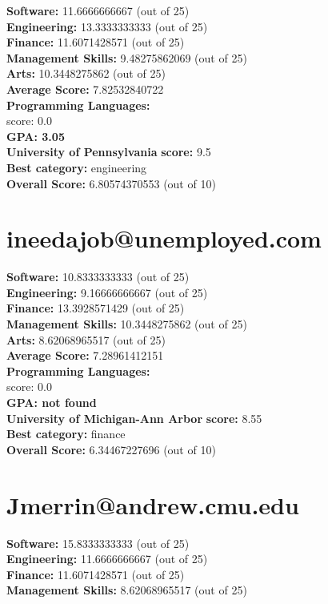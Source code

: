 \documentclass{article}
\begin{document}
\textbf{Software:} 11.6666666667 (out of 25)\\
\textbf{Engineering: } 13.3333333333 (out of 25)\\
\textbf{Finance:} 11.6071428571 (out of 25)\\
\textbf{Management Skills:} 9.48275862069 (out of 25)\\
\textbf{Arts:} 10.3448275862 (out of 25)\\
\textbf{Average Score: } 7.82532840722\\
\textbf{Programming Languages:} \\
score: 0.0\\
\textbf{GPA: 3.05}\\
\textbf{University of Pennsylvania} \textbf{score:} 9.5\\
\textbf{Best category: } engineering\\
\textbf{Overall Score: }6.80574370553 (out of 10)\section{ineedajob@unemployed.com}
\textbf{Software:} 10.8333333333 (out of 25)\\
\textbf{Engineering: } 9.16666666667 (out of 25)\\
\textbf{Finance:} 13.3928571429 (out of 25)\\
\textbf{Management Skills:} 10.3448275862 (out of 25)\\
\textbf{Arts:} 8.62068965517 (out of 25)\\
\textbf{Average Score: } 7.28961412151\\
\textbf{Programming Languages:} \\
score: 0.0\\
\textbf{GPA: not found}\\
\textbf{University of Michigan-Ann Arbor} \textbf{score:} 8.55\\
\textbf{Best category: } finance\\
\textbf{Overall Score: }6.34467227696 (out of 10)\section{Jmerrin@andrew.cmu.edu}
\textbf{Software:} 15.8333333333 (out of 25)\\
\textbf{Engineering: } 11.6666666667 (out of 25)\\
\textbf{Finance:} 11.6071428571 (out of 25)\\
\textbf{Management Skills:} 8.62068965517 (out of 25)\\
\end{document}
